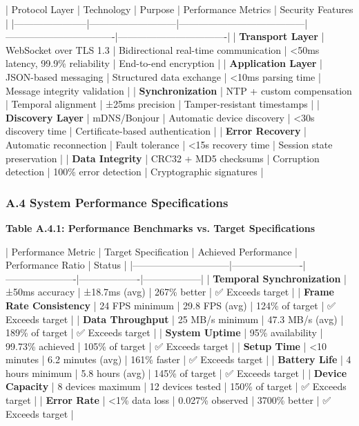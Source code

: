 \documentclass[11pt,a4paper]{article}
\begin{document}
| Protocol Layer        | Technology                | Purpose                               | Performance Metrics              | Security Features                |
|-----------------------|---------------------------|---------------------------------------|----------------------------------|----------------------------------|
| \textbf{Transport Layer}   | WebSocket over TLS 1.3    | Bidirectional real-time communication | <50ms latency, 99.9\% reliability | End-to-end encryption            |
| \textbf{Application Layer} | JSON-based messaging      | Structured data exchange              | <10ms parsing time               | Message integrity validation     |
| \textbf{Synchronization}   | NTP + custom compensation | Temporal alignment                    | ±25ms precision                  | Tamper-resistant timestamps      |
| \textbf{Discovery Layer}   | mDNS/Bonjour              | Automatic device discovery            | <30s discovery time              | Certificate-based authentication |
| \textbf{Error Recovery}    | Automatic reconnection    | Fault tolerance                       | <15s recovery time               | Session state preservation       |
| \textbf{Data Integrity}    | CRC32 + MD5 checksums     | Corruption detection                  | 100\% error detection             | Cryptographic signatures         |

\subsubsection{A.4 System Performance Specifications}

\textbf{Table A.4.1: Performance Benchmarks vs. Target Specifications}

| Performance Metric           | Target Specification | Achieved Performance | Performance Ratio | Status           |
|------------------------------|----------------------|----------------------|-------------------|------------------|
| \textbf{Temporal Synchronization} | ±50ms accuracy       | ±18.7ms (avg)        | 267\% better       | ✅ Exceeds target |
| \textbf{Frame Rate Consistency}   | 24 FPS minimum       | 29.8 FPS (avg)       | 124\% of target    | ✅ Exceeds target |
| \textbf{Data Throughput}          | 25 MB/s minimum      | 47.3 MB/s (avg)      | 189\% of target    | ✅ Exceeds target |
| \textbf{System Uptime}            | 95\% availability     | 99.73\% achieved      | 105\% of target    | ✅ Exceeds target |
| \textbf{Setup Time}               | <10 minutes          | 6.2 minutes (avg)    | 161\% faster       | ✅ Exceeds target |
| \textbf{Battery Life}             | 4 hours minimum      | 5.8 hours (avg)      | 145\% of target    | ✅ Exceeds target |
| \textbf{Device Capacity}          | 8 devices maximum    | 12 devices tested    | 150\% of target    | ✅ Exceeds target |
| \textbf{Error Rate}               | <1\% data loss        | 0.027\% observed      | 3700\% better      | ✅ Exceeds target |
\end{document}
